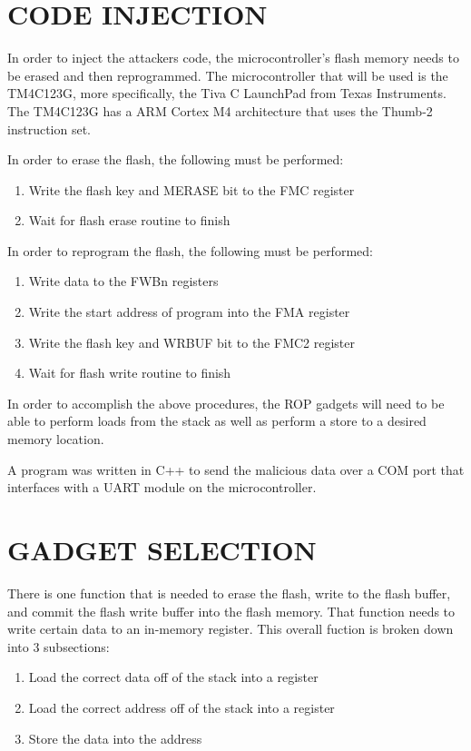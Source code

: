 \documentclass[letterpaper, 10 pt, conference]{ieeeconf}  %
\begin{document}
\section{CODE INJECTION}

In order to inject the attackers code, the microcontroller's flash memory needs to be erased and then reprogrammed.  The microcontroller that will be used is the TM4C123G, more specifically, the Tiva C LaunchPad from Texas Instruments.  The TM4C123G has a ARM Cortex M4 architecture that uses the Thumb-2 instruction set.

In order to erase the flash, the following must be performed:

\begin{enumerate}
\item Write the flash key and MERASE bit to the FMC register
\item Wait for flash erase routine to finish
\end{enumerate}

In order to reprogram the flash, the following must be performed:

\begin{enumerate}
\item Write data to the FWBn registers
\item Write the start address of program into the FMA register
\item Write the flash key and WRBUF bit to the FMC2 register
\item Wait for flash write routine to finish
\end{enumerate}

In order to accomplish the above procedures, the ROP gadgets will need to be able to perform loads from the stack as well as perform a store to a desired memory location.

A program was written in C++ to send the malicious data over a COM port that interfaces with a UART module on the microcontroller.

\section{GADGET SELECTION}

There is one function that is needed to erase the flash, write to the flash buffer, and commit the flash write buffer into the flash memory. That function needs to write certain data to an in-memory register. This overall fuction is broken down into 3 subsections:

\begin{enumerate}
\item Load the correct data off of the stack into a register
\item Load the correct address off of the stack into a register
\item Store the data into the address
\end{enumerate}
\end{document}
